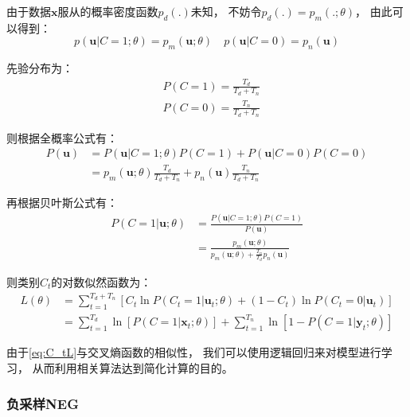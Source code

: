 由于数据$\mathbf{x}$服从的概率密度函数$p_d\left(.\right)$未知，
不妨令$p_d\left(.\right)=p_m\left(.;\theta\right)$，
由此可以得到：
\begin{equation}
    p\left(\mathbf{u}|C=1;\theta\right) = p_m\left(\mathbf{u};\theta\right) \quad p\left(\mathbf{u}|C=0\right)=p_n\left(\mathbf{u}\right)
\end{equation}

先验分布为：
\begin{equation}
    \begin{aligned}
        &P\left(C=1\right)=\frac{T_d}{T_d+T_n}\\
        &P\left(C=0\right)=\frac{T_n}{T_d+T_n}
    \end{aligned}
\end{equation}

则根据全概率公式有：
\begin{equation}
    \begin{aligned}
        P\left(\mathbf{u}\right)&=P\left(\mathbf{u}|C=1;\theta\right)P\left(C=1\right)+P\left(\mathbf{u}|C=0\right)P\left(C=0\right)\\
        &=p_m\left(\mathbf{u};\theta\right)\frac{T_d}{T_d+T_n}+p_n\left(\mathbf{u}\right)\frac{T_n}{T_d+T_n}
    \end{aligned}
\end{equation}

再根据贝叶斯公式有：
\begin{equation}
    \begin{aligned}
        P\left(C=1|\mathbf{u};\theta\right)&=\frac{P\left(\mathbf{u}|C=1;\theta\right)P\left(C=1\right)}{P\left(\mathbf{u}\right)}\\
        &=\frac{p_m\left(\mathbf{u};\theta\right)}{p_m\left(\mathbf{u};\theta\right)+\frac{T_n}{T_d}p_n\left(\mathbf{u}\right)}
    \end{aligned}
\end{equation}

则类别$C_t$的对数似然函数为：
\begin{equation}
    \label{eq:C_tL}
    \begin{aligned}
        L\left(\theta\right)&=\sum_{t=1}^{T_d+T_n}\left[C_t\ln P\left(C_t=1|\mathbf{u}_t;\theta\right)+\left(1-C_t\right)\ln P\left(C_t=0|\mathbf{u}_t\right)\right]\\
        &=\sum_{t=1}^{T_d}\ln\left[P\left(C=1|\mathbf{x}_t;\theta\right)\right]+\sum_{t=1}^{T_n}\ln\left[1-P\left(C=1|\mathbf{y}_t;\theta\right)\right]
    \end{aligned}
\end{equation}

由于\cref{eq:C_tL}与交叉熵函数的相似性，
我们可以使用逻辑回归来对模型进行学习，
从而利用相关算法达到简化计算的目的。

\subsubsection{负采样NEG}
